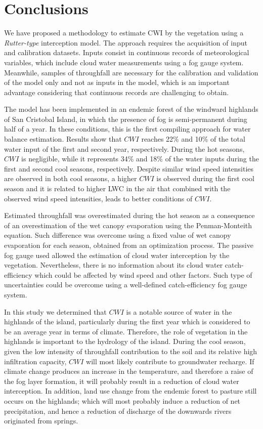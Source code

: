 \documentclass[a4paper,12pt]{article}
\begin{document}
\section{Conclusions}
We have proposed a methodology to estimate CWI by the vegetation using a \textit{Rutter-type} interception model. The approach requires the acquisition of input and calibration datasets. Inputs consist in continuous records of meteorological variables, which include cloud water measurements using a fog gauge system. Meanwhile, samples of throughfall are necessary for the calibration and validation of the model only and not as inputs in the model, which is an important advantage considering that continuous records are challenging to obtain.

The model has been implemented in an endemic forest of the windward highlands of San Cristobal Island, in which the presence of fog is semi-permanent during half of a year. In these conditions, this is the first compiling approach for water balance estimation. Results show that $CWI$ reaches 22\% and 10\% of the total water input of the first and second year, respectively. During the hot seasons, $CWI$ is negligible, while it represents 34\% and 18\% of the water inputs during the first and second cool seasons, respectively. Despite similar wind speed intensities are observed in both cool seasons, a higher $CWI$ is observed during the first cool season and it is related to higher LWC in the air that combined with the observed wind speed intensities, leads to better conditions of $CWI$.  

Estimated throughfall was overestimated during the hot season as a consequence of an overestimation of the wet canopy evaporation using the Penman-Monteith equation. Such difference was overcome using a fixed value of wet canopy evaporation for each season, obtained from an optimization process. The passive fog gauge used allowed the estimation of cloud water interception by the vegetation. Nevertheless, there is no information about its cloud water catch-efficiency which could be affected by wind speed and other factors. Such type of uncertainties could be overcome using a well-defined catch-efficiency fog gauge system.

In this study we determined that $CWI$ is a notable source of water in the highlands of the island, particularly during the first year which is considered to be an average year in terms of climate. Therefore, the role of vegetation in the highlands is important to the hydrology of the island. During the cool season, given the low intensity of throughfall contribution to the soil and its relative high infiltration capacity, $CWI$ will most likely contribute to groundwater recharge. If climate change produces an increase in the temperature, and therefore a raise of the fog layer formation, it will probably result in a reduction of cloud water interception. In addition, land use change from the endemic forest to pasture still occurs on the highlands; which will most probably induce a reduction of net precipitation, and hence a reduction of discharge of the downwards rivers originated from springs.
\end{document}
